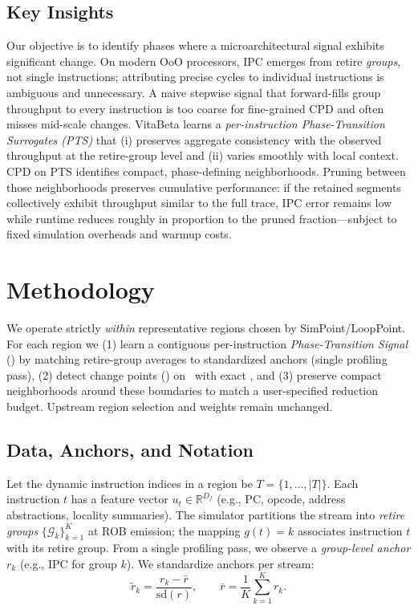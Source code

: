 \subsection{Key Insights}
\label{sec:intuition}
Our objective is to identify phases where a microarchitectural signal exhibits significant change. On modern OoO processors, IPC emerges from retire \emph{groups}, not single instructions; attributing precise cycles to individual instructions is ambiguous and unnecessary. A naive stepwise signal that forward-fills group throughput to every instruction is too coarse for fine-grained CPD and often misses mid-scale changes.
VitaBeta learns a \emph{per-instruction Phase-Transition Surrogates (PTS)} that (i) preserves aggregate consistency with the observed throughput at the retire-group level and (ii) varies smoothly with local context. CPD on PTS identifies compact, phase-defining neighborhoods. Pruning between those neighborhoods preserves cumulative performance: if the retained segments collectively exhibit throughput similar to the full trace, IPC error remains low while runtime reduces roughly in proportion to the pruned fraction—subject to fixed simulation overheads and warmup costs.
\section{Methodology}
\label{sec:methodology}
We operate strictly \emph{within} representative regions chosen by SimPoint/LoopPoint. For each region we (1) learn a contiguous per-instruction \emph{Phase-Transition Signal} (\pts) by matching retire-group averages to standardized anchors (single profiling pass), (2) detect change points (\cpd) on \pts\ with exact \pelt, and (3) preserve compact neighborhoods around these boundaries to match a user-specified reduction budget. Upstream region selection and weights remain unchanged.
\subsection{Data, Anchors, and Notation}
Let the dynamic instruction indices in a region be \(T=\{1,\ldots,|T|\}\). Each instruction \(t\) has a feature vector \(u_t\in\mathbb{R}^{D_f}\) (e.g., PC, opcode, address abstractions, locality summaries). The simulator partitions the stream into \emph{retire groups} \(\{\mathcal{G}_k\}_{k=1}^K\) at ROB emission; the mapping \(g(t)=k\) associates instruction \(t\) with its retire group. From a single profiling pass, we observe a \emph{group-level anchor} \(r_k\) (e.g., IPC for group \(k\)). We standardize anchors per stream:
\[
\tilde{r}_k=\frac{r_k-\bar{r}}{\mathrm{sd}(r)},\qquad \bar{r}=\frac{1}{K}\sum_{k=1}^{K}r_k.
\]
